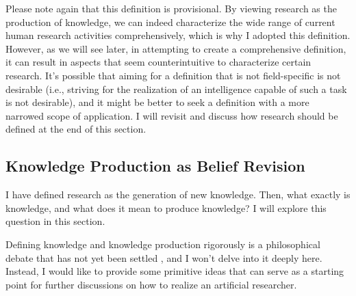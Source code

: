 


Please note again that this definition is provisional. By viewing research as the production of knowledge, we can indeed characterize the wide range of current human research activities comprehensively, which is why I adopted this definition. However, as we will see later, in attempting to create a comprehensive definition, it can result in aspects that seem counterintuitive to characterize certain research. It's possible that aiming for a definition that is not field-specific is not desirable (i.e., striving for the realization of an intelligence capable of such a task is not desirable), and it might be better to seek a definition with a more narrowed scope of application. I will revisit and discuss how research should be defined at the end of this section.

\subsection{Knowledge Production as Belief Revision}
\label{section-knowledge-production-as-belief-revision}
I have defined research as the generation of new knowledge. Then, what exactly is knowledge, and what does it mean to produce knowledge? I will explore this question in this section. 

Defining knowledge and knowledge production rigorously is a philosophical debate that has not yet been settled \cite{sep-epistemology}, and I won't delve into it deeply here. Instead, I would like to provide some primitive ideas that can serve as a starting point for further discussions on how to realize an artificial researcher.

